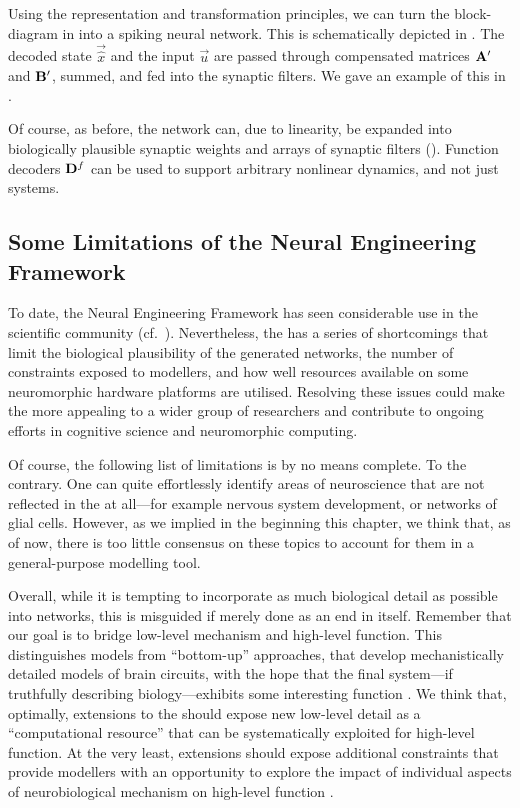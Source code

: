 Using the representation and transformation principles, we can turn the block-diagram in  into a spiking neural network.
This is schematically depicted in .
The decoded state $\vec{\hat x}$ and the input $\vec u$ are passed through compensated \LTI matrices $\mathbf{A}'$ and $\mathbf{B}'$, summed, and fed into the synaptic filters.
We gave an example of this in .

Of course, as before, the network can, due to linearity, be expanded into biologically plausible synaptic weights and arrays of synaptic filters ().
Function decoders $\mathbf{D}^f$ can be used to support arbitrary nonlinear dynamics, and not just \LTI systems.

\subsection{Some Limitations of the Neural Engineering Framework}
\label{sec:nef_limitations}

To date, the Neural Engineering Framework has seen considerable use in the scientific community (cf.~).
Nevertheless, the \NEF has a series of shortcomings that limit the biological plausibility of the generated networks, the number of constraints exposed to modellers, and how well resources available on some neuromorphic hardware platforms are utilised.
Resolving these issues could make the \NEF more appealing to a wider group of researchers and contribute to ongoing efforts in cognitive science and neuromorphic computing.

Of course, the following list of limitations is by no means complete.
To the contrary.
One can quite effortlessly identify areas of neuroscience that are not reflected in the \NEF at all---for example nervous system development, or networks of glial cells.
However, as we implied in the beginning this chapter, we think that, as of now, there is too little consensus on these topics to account for them in a general-purpose modelling tool.

Overall, while it is tempting to incorporate as much biological detail as possible into \NEF networks, this is misguided if merely done as an end in itself.
Remember that our goal is to bridge low-level mechanism and high-level function.
This distinguishes \NEF models from \enquote{bottom-up} approaches, that develop mechanistically detailed models of brain circuits, with the hope that the final system---if truthfully describing biology---exhibits some interesting function \citep[cf.][]{komer2016unified}.
We think that, optimally, extensions to the \NEF should expose new low-level detail as a \enquote{computational resource} that can be systematically exploited for high-level function.
At the very least, extensions should expose additional constraints that provide modellers with an opportunity to explore the impact of individual aspects of neurobiological mechanism on high-level function \citep[e.g.,][]{duggins2017incorporating}.

